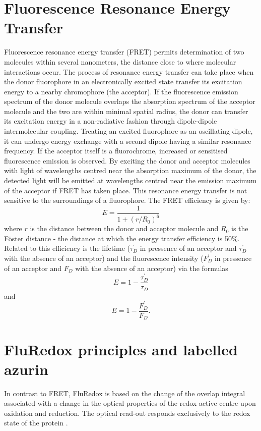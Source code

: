 \documentclass[twoside,single]{lion-msc}
\begin{document}
\section{Fluorescence Resonance Energy Transfer}
Fluorescence resonance energy transfer (FRET) permits determination of two molecules within several nanometers, the distance close to where molecular interactions occur. The process of resonance energy transfer can take place when the donor fluorophore in an electronically excited state transfer its excitation energy to a nearby chromophore (the acceptor). If the fluorescence emission spectrum of the donor molecule overlaps the absorption spectrum of the acceptor molecule and the two are within minimal spatial radius, the donor can transfer its excitation energy in a non-radiative fashion through dipole-dipole intermolecular coupling. Treating an excited fluorophore as an oscillating dipole, it can undergo energy exchange with a second dipole having a similar resonance frequency. If the acceptor itself is a fluorochrome, increased or sensitised fluorescence emission is observed. By exciting the donor and acceptor molecules with light of wavelengths centred near the absorption maximum of the donor, the detected light will be emitted at wavelengths centred near the emission maximum of the acceptor if FRET has taken place. This resonance energy transfer is not sensitive to the surroundings of a fluorophore. The FRET efficiency is given by:
\begin{equation}
E = \frac{1}{1 + (r/R_{0})^{6}}
\end{equation}
where $r$ is the distance between the donor and acceptor molecule and $R_{0}$ is the F\"oster distance - the distance at which the energy transfer efficiency is 50\%. Related to this efficiency is the lifetime ($\tau_{D}^{'}$ in pressence of an acceptor and $\tau_{D}^{'}$ with the absence of an acceptor) and the fluorescence intensity ($F_{D}^{'}$ in pressence of an acceptor and $F_{D}$ with the absence of an acceptor) via the formulas
\begin{equation}
E = 1 - \frac{\tau_{D}^{'}}{\tau_{D}}
\end{equation}
and
\begin{equation}
E = 1 - \frac{F_{D}^{'}}{F_{D}}.
\end{equation}


\section{FluRedox principles and labelled azurin}
In contrast to FRET, FluRedox is based on the change of the overlap integral associated with a change in the optical properties of the redox-active centre upon oxidation and reduction. The optical read-out responds exclusively to the redox state of the protein \cite{Akklc}. 
\end{document}
